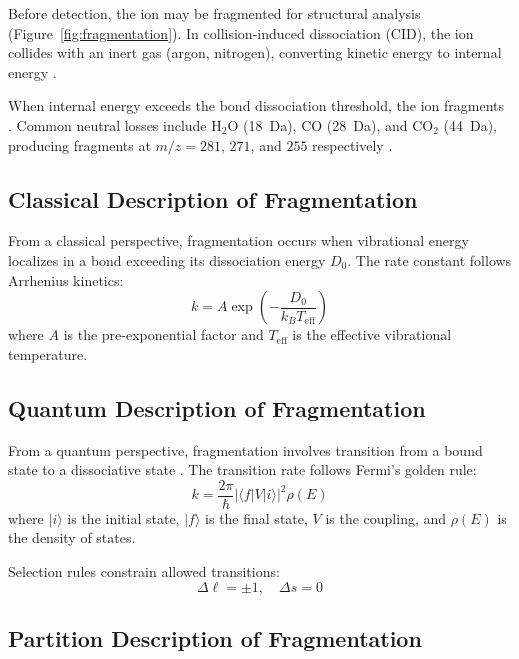 \documentclass[twocolumn,10pt]{article}
\theoremstyle{remark}
\begin{document}
Before detection, the ion may be fragmented for structural analysis (Figure~\ref{fig:fragmentation}). In collision-induced dissociation (CID), the ion collides with an inert gas (argon, nitrogen), converting kinetic energy to internal energy \cite{sleno2004ion}.

When internal energy exceeds the bond dissociation threshold, the ion fragments \cite{mclafferty1959mass}. Common neutral losses include H$_2$O (18~Da), CO (28~Da), and CO$_2$ (44~Da), producing fragments at $m/z = 281$, $271$, and $255$ respectively \cite{roepstorff1984nomenclature}.

\subsection{Classical Description of Fragmentation}

From a classical perspective, fragmentation occurs when vibrational energy localizes in a bond exceeding its dissociation energy $D_0$. The rate constant follows Arrhenius kinetics:
\begin{equation}
k = A \exp\left(-\frac{D_0}{k_B T_{\text{eff}}}\right)
\end{equation}
where $A$ is the pre-exponential factor and $T_{\text{eff}}$ is the effective vibrational temperature.

\subsection{Quantum Description of Fragmentation}

From a quantum perspective, fragmentation involves transition from a bound state to a dissociative state \cite{dirac1981principles,sakurai2017modern}. The transition rate follows Fermi's golden rule:
\begin{equation}
k = \frac{2\pi}{\hbar} |\langle f | V | i \rangle|^2 \rho(E)
\end{equation}
where $|i\rangle$ is the initial state, $|f\rangle$ is the final state, $V$ is the coupling, and $\rho(E)$ is the density of states.

Selection rules constrain allowed transitions:
\begin{equation}
\Delta \ell = \pm 1, \quad \Delta s = 0
\end{equation}

\subsection{Partition Description of Fragmentation}
\end{document}
